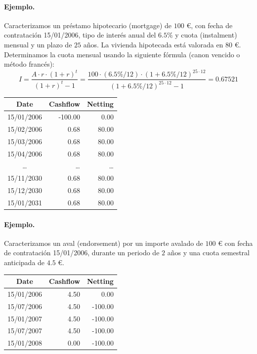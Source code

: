\paragraph{Ejemplo.}
Caracterizamos un pr\'estamo hipotecario (mortgage) de $100$ \euro, con fecha
de contrataci\'on 15/01/2006, tipo de inter\'es anual del $6.5\%$ y cuota
(instalment) mensual y un plazo de $25$ a\~nos. La vivienda hipotecada est\'a
valorada en $80$ \euro. Determinamos la cuota mensual usando la siguiente
f\'ormula (canon vencido o m\'etodo franc\'es):
\begin{displaymath}
I =
\frac{A \cdot r \cdot (1+r)^t}{(1+r)^t - 1} =
\frac{100 \cdot (6.5\%/12) \cdot (1+6.5\%/12)^{25\cdot12}}{(1+6.5\%/12)^{25\cdot12} - 1} =
0.67521
\end{displaymath}

\begin{center}
\begin{tabular}{c|r|r}
\textbf{Date} & \textbf{Cashflow} & \textbf{Netting} \\
\hline
15/01/2006 &  -100.00 &    0.00 \\
15/02/2006 &     0.68 &   80.00 \\
15/03/2006 &     0.68 &   80.00 \\
15/04/2006 &     0.68 &   80.00 \\
\dots      &    \dots &   \dots \\
15/11/2030 &     0.68 &   80.00 \\
15/12/2030 &     0.68 &   80.00 \\
15/01/2031 &     0.68 &   80.00
\end{tabular}
\end{center}

\paragraph{Ejemplo.}
Caracterizamos un aval (endorsement) por un importe avalado de $100$ \euro
con fecha de contrataci\'on 15/01/2006, durante un periodo de $2$ a\~nos y
una cuota semestral anticipada de $4.5$ \euro.

\begin{center}
\begin{tabular}{c|r|r}
\textbf{Date} & \textbf{Cashflow} & \textbf{Netting} \\
\hline
15/01/2006 &     4.50 &    0.00 \\
15/07/2006 &     4.50 & -100.00 \\
15/01/2007 &     4.50 & -100.00 \\
15/07/2007 &     4.50 & -100.00 \\
15/01/2008 &     0.00 & -100.00
\end{tabular}
\end{center}



